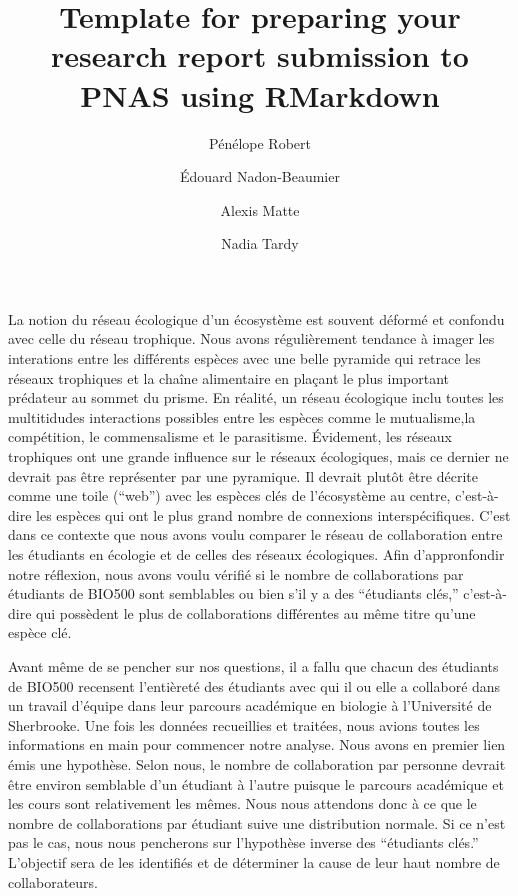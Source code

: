 \documentclass[9pt,twocolumn,twoside,]{pnas-new}
\title{Template for preparing your research report submission to PNAS
using RMarkdown}
\author[a]{Pénélope Robert}
\author[a]{Édouard Nadon-Beaumier}
\author[a]{Alexis Matte}
\author[a]{Nadia Tardy}
\affil[a]{Université de Sherbrooke, Départment de bio, 2500 Boulevard
de l'Université, Sherbrooke, Québec, G1V 0A9}
\begin{document}
\verticaladjustment{-2pt}



\maketitle
\thispagestyle{firststyle}


\acknow{}

La notion du réseau écologique d'un écosystème est souvent déformé et
confondu avec celle du réseau trophique. Nous avons régulièrement
tendance à imager les interations entre les différents espèces avec une
belle pyramide qui retrace les réseaux trophiques et la chaîne
alimentaire en plaçant le plus important prédateur au sommet du prisme.
En réalité, un réseau écologique inclu toutes les multitidudes
interactions possibles entre les espèces comme le mutualisme,la
compétition, le commensalisme et le parasitisme. Évidement, les réseaux
trophiques ont une grande influence sur le réseaux écologiques, mais ce
dernier ne devrait pas être représenter par une pyramique. Il devrait
plutôt être décrite comme une toile (``web'') avec les espèces clés de
l'écosystème au centre, c'est-à-dire les espèces qui ont le plus grand
nombre de connexions interspécifiques. C'est dans ce contexte que nous
avons voulu comparer le réseau de collaboration entre les étudiants en
écologie et de celles des réseaux écologiques. Afin d'appronfondir notre
réflexion, nous avons voulu vérifié si le nombre de collaborations par
étudiants de BIO500 sont semblables ou bien s'il y a des ``étudiants
clés,'' c'est-à-dire qui possèdent le plus de collaborations différentes
au même titre qu'une espèce clé.

Avant même de se pencher sur nos questions, il a fallu que chacun des
étudiants de BIO500 recensent l'entièreté des étudiants avec qui il ou
elle a collaboré dans un travail d'équipe dans leur parcours académique
en biologie à l'Université de Sherbrooke. Une fois les données
recueillies et traitées, nous avions toutes les informations en main
pour commencer notre analyse. Nous avons en premier lien émis une
hypothèse. Selon nous, le nombre de collaboration par personne devrait
être environ semblable d'un étudiant à l'autre puisque le parcours
académique et les cours sont relativement les mêmes. Nous nous attendons
donc à ce que le nombre de collaborations par étudiant suive une
distribution normale. Si ce n'est pas le cas, nous nous pencherons sur
l'hypothèse inverse des ``étudiants clés.'' L'objectif sera de les
identifiés et de déterminer la cause de leur haut nombre de
collaborateurs.
\end{document}
